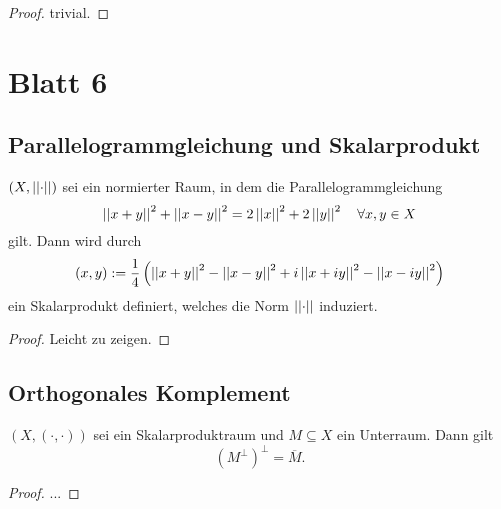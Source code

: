 \documentclass[FunkAnaskriptSS2017.tex]{subfiles}
\begin{document}
	\begin{proof}
		trivial.
	\end{proof}
	
	
	
\newpage
\section{Blatt 6}

\subsection{ Parallelogrammgleichung und Skalarprodukt}
\label{B6.1}
	$(X,\left\lvert \left\lvert \cdot \right\rvert \right\rvert)$ sei ein normierter Raum, in dem die Parallelogrammgleichung 
	$$\left\lvert \left\lvert x+y \right\rvert \right\rvert^2 + \left\lvert \left\lvert x-y \right\rvert \right\rvert^2 = 2\left\lvert \left\lvert x \right\rvert \right\rvert^2 + 2\left\lvert \left\lvert y \right\rvert \right\rvert^2\quad \forall x,y \in X$$	
	gilt. Dann wird durch 
	$$(x,y) := \frac{1}{4} \left( \left\lvert \left\lvert x+y \right\rvert \right\rvert^2 - \left\lvert \left\lvert x-y \right\rvert \right\rvert^2 + i\left\lvert \left\lvert x+iy \right\rvert \right\rvert^2 - \left\lvert \left\lvert x-iy \right\rvert \right\rvert^2 \right)$$
	ein Skalarprodukt definiert, welches die Norm $\left\lvert \left\lvert \cdot \right\rvert \right\rvert$ induziert.
	
	\begin{proof}
	Leicht zu zeigen.
	\end{proof}

\subsection{ Orthogonales Komplement}
\label{B6.2}
	$(X,(\cdot, \cdot) )$ sei ein Skalarproduktraum \todoo[ vollständig?!] und $M\subseteq X$ ein Unterraum. Dann gilt
	$$\left( M^{\perp} \right)^{\perp} = \overline{M}.$$ 
	\begin{proof}
	...
	\end{proof}


\end{document}
